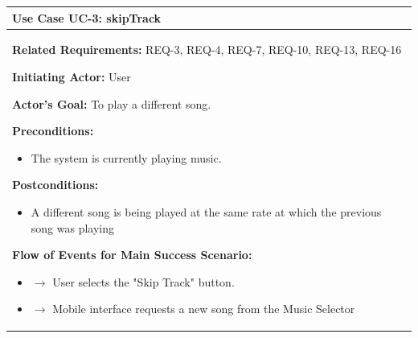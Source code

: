 \documentclass[letterpaper,english, 12pt]{scrreprt}
\begin{document}
\begin{center}
        \begin{tabular}{|C{15cm}|}
                \hline
                        \textbf{Use Case UC-3: skipTrack}\\
                \hline
                        \begin{flushleft}
                                \textbf{Related Requirements: } REQ-3, REQ-4, REQ-7, REQ-10, REQ-13, REQ-16
                        \end{flushleft}
                        \begin{flushleft}
                                \textbf{Initiating Actor: } User
                        \end{flushleft}
                        \begin{flushleft}
                                \textbf{Actor's Goal: } To play a different song.
                        \end{flushleft}
                        \begin{flushleft}
                                \textbf{Preconditions: }
                        \end{flushleft}
                                \begin{itemize}
                                        \item The system is currently playing music.
                                \end{itemize}
                        \begin{flushleft}
                                \textbf{Postconditions: }
                        \end{flushleft}
                                \begin{itemize}
                                        \item A different song is being played at the same rate at which the previous song was playing
                                \end{itemize}
                        \begin{flushleft}
                                \textbf{Flow of Events for Main Success Scenario: }
                        \end{flushleft}
                                \begin{itemize}
                                        \item $\rightarrow$ User selects the "Skip Track" button.
					\item $\rightarrow$ Mobile interface requests a new song from the Music Selector
					

\end{itemize}
\end{tabular}
\end{center}
\end{document}
